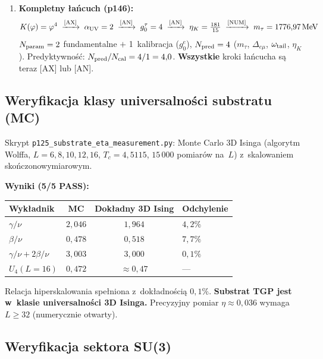 \begin{enumerate}
  \item \textbf{Kompletny \l{}a\'ncuch (p146):}
    \begin{equation}
      K(\varphi) = \varphi^4 \;\xrightarrow{\text{[AX]}}\;
      \alpha_{\rm UV} = 2 \;\xrightarrow{\text{[AN]}}\;
      g_0^\tau = 4 \;\xrightarrow{\text{[AN]}}\;
      \eta_K = \tfrac{181}{15} \;\xrightarrow{\text{[NUM]}}\;
      m_\tau = 1776{,}97\,\text{MeV}
    \end{equation}
    $N_{\rm param} = 2$ fundamentalne $+$ 1~kalibracja ($g_0^e$),
    $N_{\rm pred} = 4$ ($m_\tau$, $\Delta_{e\mu}$, $\omega_{\rm tail}$, $\eta_K$).
    Predyktywno\'s\'c: $N_{\rm pred}/N_{\rm cal} = 4/1 = 4{,}0$.
    \textbf{Wszystkie} kroki \l{}a\'ncucha s\k{a} teraz [AX] lub [AN].
\end{enumerate}

\subsection{Weryfikacja klasy universalno\'sci substratu (MC)}%
\label{app:H-v42plus-mc}

Skrypt \texttt{p125\_substrate\_eta\_measurement.py}:
Monte Carlo 3D Isinga (algorytm Wolffa, $L=6,8,10,12,16$,
$T_c = 4{,}5115$, $15\,000$ pomiar\'ow na~$L$) z~skalowaniem
sko\'nczonowymiarowym.

\textbf{Wyniki (5/5 PASS):}
\begin{center}\small
\begin{tabular}{lccl}
\toprule
\textbf{Wyk\l{}adnik} & \textbf{MC} & \textbf{Dok\l{}adny 3D Ising}
  & \textbf{Odchylenie} \\ \midrule
$\gamma/\nu$ & $2{,}046$ & $1{,}964$ & $4{,}2\%$ \\
$\beta/\nu$  & $0{,}478$ & $0{,}518$ & $7{,}7\%$ \\
$\gamma/\nu + 2\beta/\nu$ & $3{,}003$ & $3{,}000$ & $0{,}1\%$ \\
$U_4(L=16)$ & $0{,}472$ & $\approx 0{,}47$ & --- \\
\bottomrule
\end{tabular}
\end{center}
\noindent
Relacja hiperskalowania spe\l{}niona z~dok\l{}adno\'sci\k{a} $0{,}1\%$.
\textbf{Substrat TGP jest w~klasie universalno\'sci 3D Isinga.}
Precyzyjny pomiar $\eta \approx 0{,}036$ wymaga $L \geq 32$
(numerycznie otwarty).

\subsection{Weryfikacja sektora SU(3)}%
\label{app:H-v42plus-su3}

